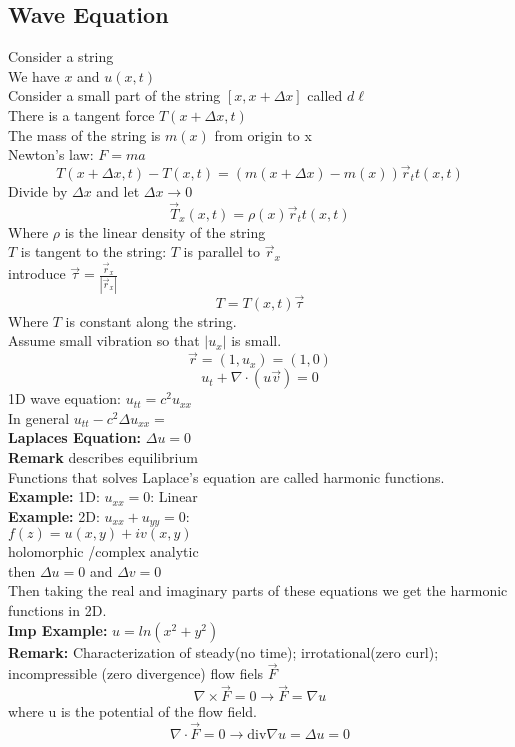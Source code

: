 \documentclass{article}
\begin{document}
\subsection*{Wave Equation}
Consider a string\\
We have $x$ and $u(x,t)$\\
Consider a small part of the string $[x,x+\Delta x]$ called $d\ell$\\
There is a tangent force $T(x + \Delta x,t)$\\
The mass of the string is $m(x)$ from origin to x\\
Newton's law: $F = ma$\\
$$T(x+\Delta x,t) - T(x,t) = (m(x + \Delta x) - m(x)) \vec{r}_tt(x,t)$$
Divide by $\Delta x$ and let $\Delta x \rightarrow 0$\\
$$\vec{T}_x(x,t) = \rho(x) \vec{r}_tt(x,t)$$
Where $\rho$ is the linear density of the string\\
$T$ is tangent to the string: $T$ is parallel to $\vec{r}_x$ \\
introduce $\vec{\tau} = \frac{\vec{r}_x}{| \vec{r}_x |}$\\
$$T = T(x,t) \vec{\tau}$$
Where $T$ is constant along the string.\\
Assume small vibration so that $|u_x|$ is small.\\
$$\vec{r} = (1,u_x) = (1,0) $$
$$u_t + \nabla \cdot (u \vec{v}) = 0$$
1D wave equation: $u_{tt} = c^2 u_{xx}$\\
In general $u_{tt} - c^2\Delta u_{xx} = $\\
\textbf{Laplaces Equation:} $\Delta u = 0$\\
\textbf{Remark} describes equilibrium \\
Functions that solves Laplace's equation are called harmonic functions.\\
\textbf{Example:} 1D: $u_{xx} = 0$: Linear\\
\textbf{Example:} 2D: $u_{xx} + u_{yy} = 0$:\\
$f(z) = u(x,y) + iv(x,y)$\\
holomorphic /complex analytic\\
then $\Delta u = 0$ and $\Delta v = 0$\\
Then taking the real and imaginary parts of these equations we get the harmonic functions in 2D.\\
\textbf{Imp Example:} $u = ln(x^2+y^2)$\\
\textbf{Remark: } Characterization of steady(no time); irrotational(zero curl); incompressible (zero divergence) flow fiels $\vec{F}$\\
$$\nabla \times \vec{F} = 0 \rightarrow \vec{F} = \nabla u$$
where u is the potential of the flow field.\\
$$\nabla \cdot \vec{F} = 0 \rightarrow \text{div} \nabla u = \Delta u = 0 $$
\end{document}
